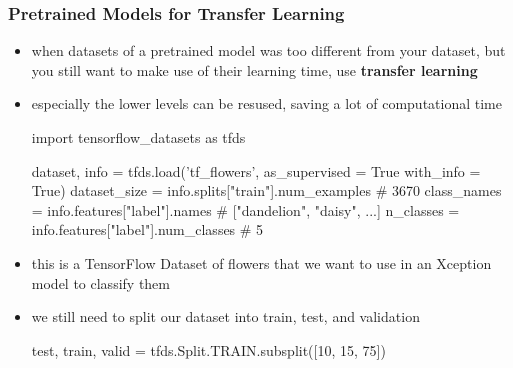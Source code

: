 \documentclass[12pt,a4paper]{article}
\begin{document}
\subsubsection{Pretrained Models for Transfer Learning} %
\label{ssub:pretrained_models_for_transfer_learning}
\begin{itemize}
  \item when datasets of a pretrained model was too different from your dataset, but you still want to make use of their learning time, use \textbf{transfer learning}
  \item especially the lower levels can be resused, saving a lot of computational time
  \begin{python}
    import tensorflow_datasets as tfds

    dataset, info = tfds.load('tf_flowers', as_supervised = True
                              with_info = True)
    dataset_size  = info.splits["train"].num_examples # 3670
    class_names = info.features["label"].names # ["dandelion", 
                                                  "daisy", ...]
    n_classes = info.features["label"].num_classes # 5
  \end{python}
  \item this is a TensorFlow Dataset of flowers that we want to use in an Xception model to classify them
  \item we still need to split our dataset into train, test, and validation
  \begin{python}
    test, train, valid = tfds.Split.TRAIN.subsplit([10, 15, 75])


\end{python}
\end{itemize}
\end{document}
